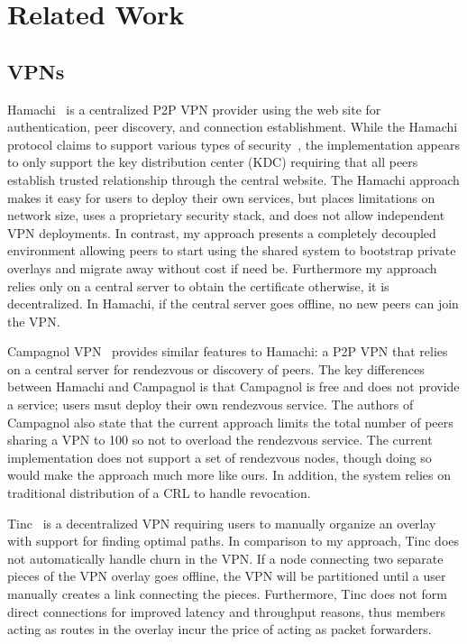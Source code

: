 \section{Related Work}
\label{vpn:related_work}

\subsection{VPNs}

Hamachi~\cite{hamachi} is a centralized P2P VPN provider using the web site for
authentication, peer discovery, and connection establishment.  While the
Hamachi protocol claims to support various types of
security~\cite{hamachi_security}, the implementation appears to only support
the key distribution center (KDC) requiring that all peers establish trusted
relationship through the central website.  The Hamachi approach makes it easy
for users to deploy their own services, but places limitations on network size,
uses a proprietary security stack, and does not allow independent VPN
deployments.  In contrast, my approach presents a completely decoupled
environment allowing peers to start using the shared system to bootstrap
private overlays and migrate away without cost if need be.  Furthermore my
approach relies only on a central server to obtain the certificate otherwise,
it is decentralized.  In Hamachi, if the central server goes offline, no new
peers can join the VPN.

Campagnol VPN~\cite{campagnol} provides similar features to Hamachi: a P2P VPN
that relies on a central server for rendezvous or discovery of peers.  The key
differences between Hamachi and Campagnol is that Campagnol is free and does
not provide a service; users msut deploy their own rendezvous service.  The
authors of Campagnol also state that the current approach limits the total
number of peers sharing a VPN to 100 so not to overload the rendezvous service.
The current implementation does not support a set of rendezvous nodes, though
doing so would make the approach much more like ours.  In addition, the system
relies on traditional distribution of a CRL to handle revocation.

Tinc~\cite{tinc} is a decentralized VPN requiring users to manually organize an
overlay with support for finding optimal paths.  In comparison to my approach,
Tinc does not automatically handle churn in the VPN.  If a node connecting two
separate pieces of the VPN overlay goes offline, the VPN will be partitioned
until a user manually creates a link connecting the pieces.  Furthermore, Tinc
does not form direct connections for improved latency and throughput reasons,
thus members acting as routes in the overlay incur the price of acting as
packet forwarders.

